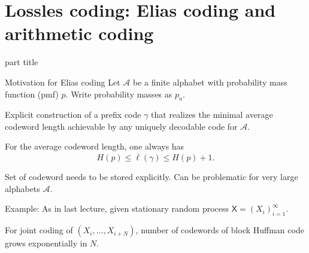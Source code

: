 
\DeclareMathOperator{\cwd}{codeword}
\newtheorem{proposition}{Proposition}
\usepackage{forest}
\usepackage{lipsum}
\usepackage{subcaption}






\section{Lossles coding: Elias coding and arithmetic coding}


\begin{frame}
 \vspace{8.0ex}
\begin{center}
\begin{beamercolorbox}[sep=12pt,center]{part title}
\insertsection\par
\end{beamercolorbox}
\end{center}
\end{frame}



\begin{frame}{Motivation for Elias coding}
Let $\mathcal{A}$ be a finite alphabet with probability mass function (pmf) $p$. 
Write probability masses as $p_a$. 
%

\bit
\item Explicit construction of a prefix code $\gamma$ that realizes the minimal average codeword length achievable by any uniquely decodable 
code for $\mathcal{A}$. 
\item For the average codeword length, one always has
\[
H(p)\leq \overline{\ell}(\gamma)\leq H(p)+1.
\]
\eit
{} 
\bit
\item Set of codeword needs to be stored explicitly. Can be problematic for very large alphabets $\mathcal{A}$. 
\item Example: As in last lecture, given stationary random process $\mathsf{X}=(X_i)_{i=1}^\infty$. 
\item For joint coding of $(X_{i},\dots,X_{i+N})$, number of codewords of block Huffman code grows exponentially in $N$.
\eit  
\end{frame}

